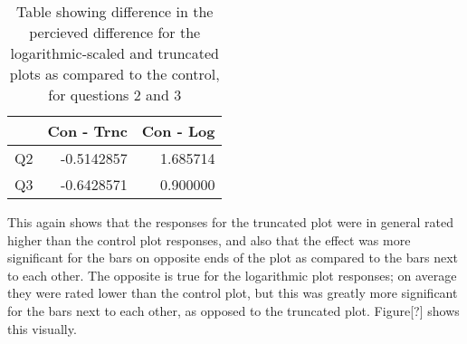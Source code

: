 \documentclass[
]{article}
\newenvironment{Shaded}{\begin{snugshade}}{\end{snugshade}}
\newcommand{\DataTypeTok}[1]{\textcolor[rgb]{0.13,0.29,0.53}{#1}}
\newcommand{\KeywordTok}[1]{\textcolor[rgb]{0.13,0.29,0.53}{\textbf{#1}}}
\newcommand{\NormalTok}[1]{#1}
\newcommand{\OperatorTok}[1]{\textcolor[rgb]{0.81,0.36,0.00}{\textbf{#1}}}
\newcommand{\StringTok}[1]{\textcolor[rgb]{0.31,0.60,0.02}{#1}}
\begin{document}
\begin{Shaded}
\end{Shaded}

\begin{table}[!h]

\caption{\label{tab:unnamed-chunk-23}Table showing difference in the percieved difference for the logarithmic-scaled and truncated plots as compared to the control, for questions 2 and 3}
\centering
\begin{tabular}[t]{l|r|r}
\hline
  & Con - Trnc & Con - Log\\
\hline
Q2 & -0.5142857 & 1.685714\\
\hline
Q3 & -0.6428571 & 0.900000\\
\hline
\end{tabular}
\end{table}

This again shows that the responses for the truncated plot were in
general rated higher than the control plot responses, and also that the
effect was more significant for the bars on opposite ends of the plot as
compared to the bars next to each other. The opposite is true for the
logarithmic plot responses; on average they were rated lower than the
control plot, but this was greatly more significant for the bars next to
each other, as opposed to the truncated plot. Figure{[}?{]} shows this
visually.
\end{document}
